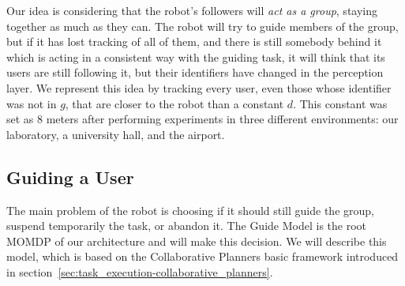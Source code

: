 Our idea is considering that the robot's followers will \textit{act as a group}, staying together as much as they can. The robot will try to guide members of the group, but if it has lost tracking of all of them, and there is still somebody behind it which is acting in a consistent way with the guiding task, it will think that its users are still following it, but their identifiers have changed in the perception layer. We represent this idea by tracking every user, even those whose identifier was not in $g$, that are closer to the robot than a constant $d$.  This constant was set as 8 meters after performing experiments in three different environments: our laboratory, a university hall, and the airport. 


\subsection{Guiding a User}
The main problem of the robot is choosing if it should still guide the group, suspend temporarily the task, or abandon it. The Guide Model is the root MOMDP of our architecture and will make this decision. We will describe this model, which is based on the Collaborative Planners basic framework introduced in section~\ref{sec:task_execution-collaborative_planners}.

